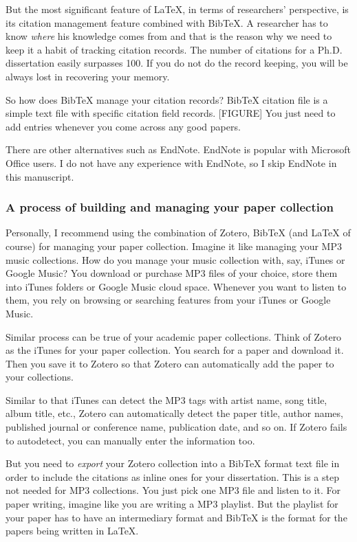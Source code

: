 \documentclass[11pt]{article}
\begin{document}
But the most significant feature of LaTeX, in terms of researchers'
perspective, is its citation management feature combined with BibTeX. A
researcher has to know \emph{where} his knowledge comes from and that is the
reason why we need to keep it a habit of tracking citation records.  The
number of citations for a Ph.D. dissertation easily surpasses 100.  If you do
not do the record keeping, you will be always lost in recovering your memory.

So how does BibTeX manage your citation records? BibTeX citation file is a
simple text file with specific citation field records. [FIGURE] You just need
to add entries whenever you come across any good papers. 

There are other alternatives such as EndNote. EndNote is popular with
Microsoft Office users. I do not have any experience with EndNote, so I skip
EndNote in this manuscript. 

\subsubsection{A process of building and managing your paper collection}
Personally, I recommend using the combination of Zotero, BibTeX (and LaTeX of
course) for managing your paper collection. Imagine it like managing your MP3
music collections. How do you manage your music collection with, say, iTunes
or Google Music? You download or purchase MP3 files of your choice, store them
into iTunes folders or Google Music cloud space. Whenever you want to listen
to them, you rely on browsing or searching features from your iTunes or Google
Music.

Similar process can be true of your academic paper collections. Think of
Zotero as the iTunes for your paper collection. You search for a paper and
download it. Then you save it to Zotero so that Zotero can automatically add
the paper to your collections. 

Similar to that iTunes can detect the MP3 tags with artist name, song title,
album title, etc., Zotero can automatically detect the paper title, author
names, published journal or conference name, publication date, and so on. If
Zotero fails to autodetect, you can manually enter the information too.

But you need to \emph{export} your Zotero collection into a BibTeX format
text file in order to include the citations as inline ones for your
dissertation. This is a step not needed for MP3 collections. You just pick one
MP3 file and listen to it. For paper writing, imagine like you are writing a
MP3 playlist. But the playlist for your paper has to have an intermediary
format and BibTeX is the format for the papers being written in LaTeX.
\end{document}
